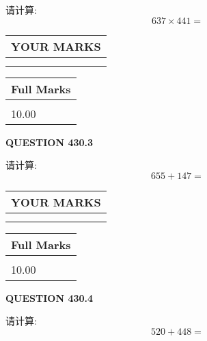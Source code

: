 \documentclass{ctexart}
\begin{document}
  
 
请计算:
\begin{equation}
637  \times    %
441 = \nonumber
\end{equation}
 

 

 
  
\vspace{0.2in}
  
\noindent\begin{tabular}{|l|}
\hline
 YOUR MARKS  \\
\hline
 \\ 
 \\ 
\hline
\end{tabular}
\hspace{0.05in} \begin{tabular}{|l|}
\hline
 Full Marks  \\
\hline
 \\ 
10.00 \\
\hline
\end{tabular}
{\textbf{\Large{QUESTION
430.3 
}}}
  
  
 
请计算:
\begin{equation}
655 +  %
147 = \nonumber
\end{equation}
 

 

 
  
\vspace{0.2in}
  
\noindent\begin{tabular}{|l|}
\hline
 YOUR MARKS  \\
\hline
 \\ 
 \\ 
\hline
\end{tabular}
\hspace{0.05in} \begin{tabular}{|l|}
\hline
 Full Marks  \\
\hline
 \\ 
10.00 \\
\hline
\end{tabular}
{\textbf{\Large{QUESTION
430.4 
}}}
  
  
 
请计算:
\begin{equation}
520 +  %
448 = \nonumber
\end{equation}
 

 

 
  
\vspace{0.2in}
  
\end{document}
